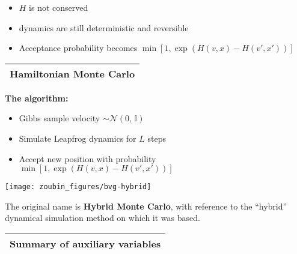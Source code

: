 \documentclass[25pt,landscape]{foils}
\newcommand{\Gray}{\textcolor{mygray}}
\newcommand{\Green}{\textcolor{mypine}}
\newcommand{\myfoilhead}[1]{
\newpage
\vspace*{-1cm}
\Gray{
\begin{tabular*}{\textwidth}{l}
{\bf \Huge #1} \\
\bottomrule
\end{tabular*}}}
\newcommand{\myindent}[1]{
\hspace*{0.1\linewidth}\begin{minipage}{0.89\linewidth}
    #1
\end{minipage}}
\newcommand{\I}{\mathbb I}
\newcommand{\N}{\mathcal{N}}
\begin{document}
\begin{itemize}
    \item $H$ is not conserved
    \item dynamics are still deterministic and reversible
    \item Acceptance probability becomes $\min[1,\exp(H(v,x)-H(v',x'))]$
\end{itemize}

\vfill
\vfill

\myfoilhead{Hamiltonian Monte Carlo}

\vfill

\begin{minipage}{0.6\linewidth}

    \Green{\bf The algorithm:}
\begin{itemize}
    \item Gibbs sample velocity $\sim \N(0,\,\I)$
    \item Simulate Leapfrog dynamics for $L$ steps
    \item Accept new position with probability\\
          $\min[1,\exp(H(v,x)-H(v',x'))]$
\end{itemize}

\bigskip

\end{minipage}
\begin{minipage}{0.39\linewidth}
    \texttt{[image: zoubin\_figures/bvg-hybrid]}
\end{minipage}


\vfill

The original name is \Green{\bf Hybrid Monte Carlo}, with reference
to the ``hybrid'' dynamical simulation method on which it was based.
% 
% 
% 
% 
% 

\myfoilhead{Summary of auxiliary variables}

\vfill
\end{document}

